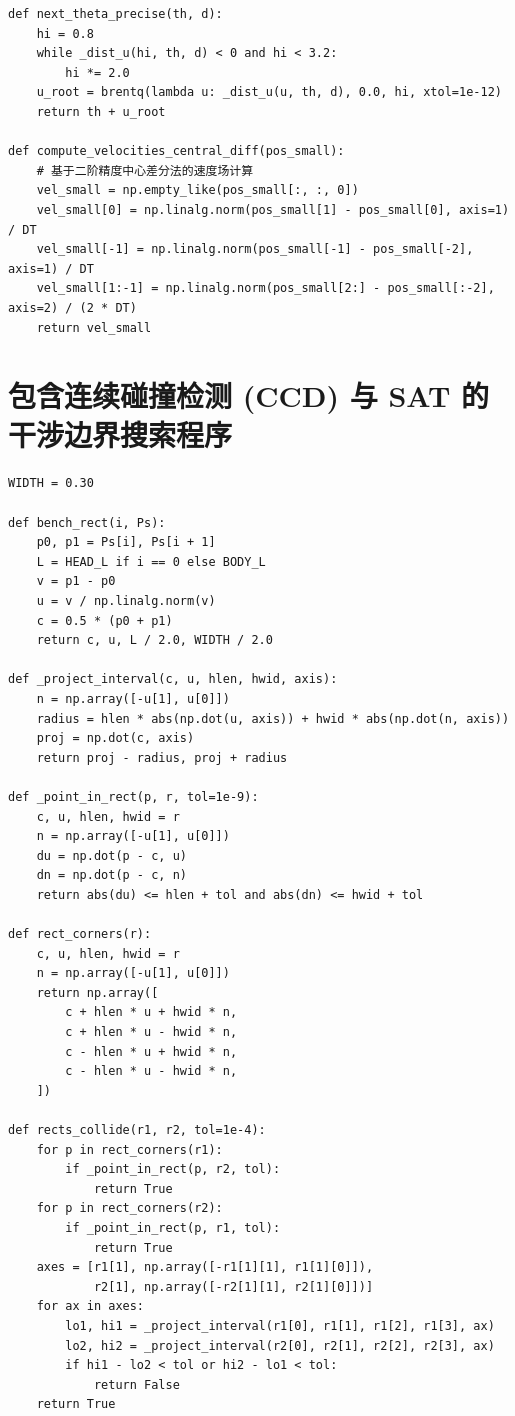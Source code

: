 ﻿\documentclass{cumcmthesis}
\begin{document}
\begin{appendices}
\begin{lstlisting}
def next_theta_precise(th, d):
    hi = 0.8
    while _dist_u(hi, th, d) < 0 and hi < 3.2:
        hi *= 2.0
    u_root = brentq(lambda u: _dist_u(u, th, d), 0.0, hi, xtol=1e-12)
    return th + u_root

def compute_velocities_central_diff(pos_small):
    # 基于二阶精度中心差分法的速度场计算
    vel_small = np.empty_like(pos_small[:, :, 0])
    vel_small[0] = np.linalg.norm(pos_small[1] - pos_small[0], axis=1) / DT
    vel_small[-1] = np.linalg.norm(pos_small[-1] - pos_small[-2], axis=1) / DT
    vel_small[1:-1] = np.linalg.norm(pos_small[2:] - pos_small[:-2], axis=2) / (2 * DT)
    return vel_small
\end{lstlisting}

\section{包含连续碰撞检测 (CCD) 与 SAT 的干涉边界搜索程序}
\begin{lstlisting}
WIDTH = 0.30

def bench_rect(i, Ps):
    p0, p1 = Ps[i], Ps[i + 1]
    L = HEAD_L if i == 0 else BODY_L
    v = p1 - p0
    u = v / np.linalg.norm(v)
    c = 0.5 * (p0 + p1)
    return c, u, L / 2.0, WIDTH / 2.0

def _project_interval(c, u, hlen, hwid, axis):
    n = np.array([-u[1], u[0]])
    radius = hlen * abs(np.dot(u, axis)) + hwid * abs(np.dot(n, axis))
    proj = np.dot(c, axis)
    return proj - radius, proj + radius

def _point_in_rect(p, r, tol=1e-9):
    c, u, hlen, hwid = r
    n = np.array([-u[1], u[0]])
    du = np.dot(p - c, u)
    dn = np.dot(p - c, n)
    return abs(du) <= hlen + tol and abs(dn) <= hwid + tol

def rect_corners(r):
    c, u, hlen, hwid = r
    n = np.array([-u[1], u[0]])
    return np.array([
        c + hlen * u + hwid * n,
        c + hlen * u - hwid * n,
        c - hlen * u + hwid * n,
        c - hlen * u - hwid * n,
    ])

def rects_collide(r1, r2, tol=1e-4):
    for p in rect_corners(r1):
        if _point_in_rect(p, r2, tol):
            return True
    for p in rect_corners(r2):
        if _point_in_rect(p, r1, tol):
            return True
    axes = [r1[1], np.array([-r1[1][1], r1[1][0]]),
            r2[1], np.array([-r2[1][1], r2[1][0]])]
    for ax in axes:
        lo1, hi1 = _project_interval(r1[0], r1[1], r1[2], r1[3], ax)
        lo2, hi2 = _project_interval(r2[0], r2[1], r2[2], r2[3], ax)
        if hi1 - lo2 < tol or hi2 - lo1 < tol:
            return False         
    return True


\end{lstlisting}
\end{appendices}
\end{document}
